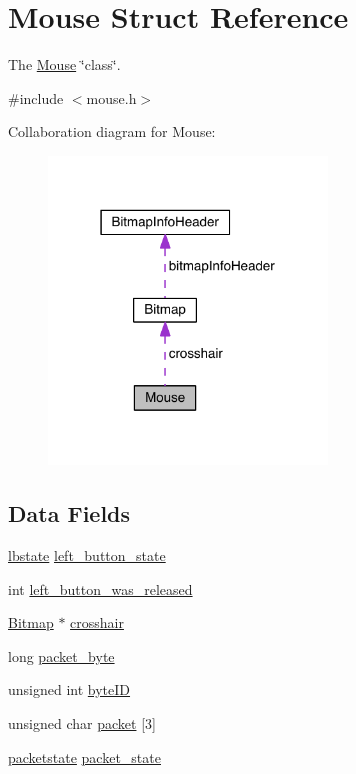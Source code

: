 \hypertarget{struct_mouse}{}\section{Mouse Struct Reference}
\label{struct_mouse}


The \hyperlink{struct_mouse}{Mouse} \char`\"{}class\char`\"{}.  




{\ttfamily \#include $<$mouse.\+h$>$}



Collaboration diagram for Mouse\+:
\nopagebreak
\begin{figure}[H]
\begin{center}
\leavevmode
\includegraphics[width=210pt]{struct_mouse__coll__graph}
\end{center}
\end{figure}
\subsection*{Data Fields}
\begin{DoxyCompactItemize}
\item 
\hyperlink{group__mouse_gaab5a16f4c5c371d5048e7a729a8b45c7}{lbstate} \hyperlink{struct_mouse_a3460dc9908f5759debb0d94ccd939eb0}{left\+\_\+button\+\_\+state}
\item 
int \hyperlink{struct_mouse_a0fc78a583cf4573ff7df06591ac3b4ef}{left\+\_\+button\+\_\+was\+\_\+released}
\item 
\hyperlink{struct_bitmap}{Bitmap} $\ast$ \hyperlink{struct_mouse_a6d9b94480453acd797d61e51453ff026}{crosshair}
\item 
long \hyperlink{struct_mouse_a005ddb9e0f69d5f8ff8ba9811006637f}{packet\+\_\+byte}
\item 
unsigned int \hyperlink{struct_mouse_a593aab8c835cac0b2110f8d4e3f4124e}{byte\+ID}
\item 
unsigned char \hyperlink{struct_mouse_a1d1878244696a8be772aa71772c33f0a}{packet} \mbox{[}3\mbox{]}
\item 
\hyperlink{group__mouse_ga15fce23ec12347df2f9ef8c3366eb01d}{packetstate} \hyperlink{struct_mouse_a600d48813331aacf281603f33b7ce452}{packet\+\_\+state}
\end{DoxyCompactItemize}


